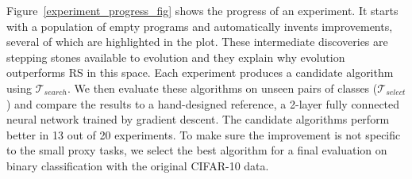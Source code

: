 
Figure~\ref{experiment_progress_fig} shows the progress of an experiment. It starts with a population of empty programs and automatically invents improvements, several of which are highlighted in the plot. These intermediate discoveries are stepping stones available to evolution and they explain why evolution outperforms RS in this space. 
Each experiment produces a candidate algorithm using $\mathcal{T}_{search}$. 
We then evaluate these algorithms on unseen pairs of classes ($\mathcal{T}_{select}$) and compare the results to a hand-designed reference, a 2-layer fully connected neural network trained by gradient descent. The candidate algorithms perform better in 13 out of 20 experiments. To make sure the improvement is not specific to the small proxy tasks, we select the best algorithm for a final evaluation on binary classification with the original CIFAR-10 data.

